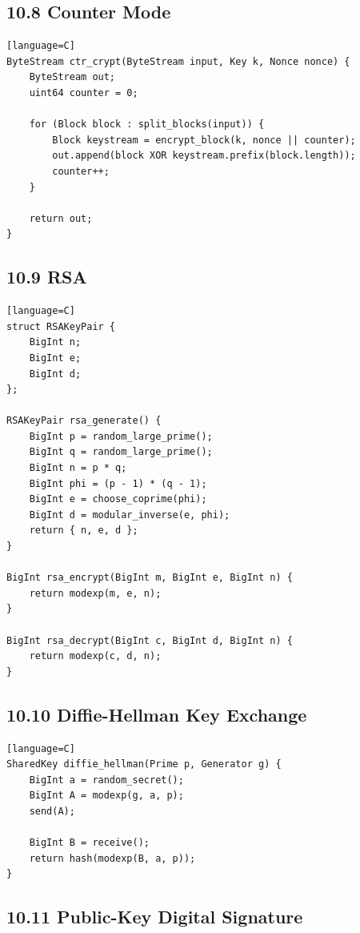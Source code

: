 \documentclass[11pt]{article}
\begin{document}
\subsection{10.8 Counter Mode}\label{counter-mode}

\begin{verbatim}[language=C]
ByteStream ctr_crypt(ByteStream input, Key k, Nonce nonce) {
    ByteStream out;
    uint64 counter = 0;

    for (Block block : split_blocks(input)) {
        Block keystream = encrypt_block(k, nonce || counter);
        out.append(block XOR keystream.prefix(block.length));
        counter++;
    }

    return out;
}
\end{verbatim}

\subsection{10.9 RSA}\label{rsa}

\begin{verbatim}[language=C]
struct RSAKeyPair {
    BigInt n;
    BigInt e;
    BigInt d;
};

RSAKeyPair rsa_generate() {
    BigInt p = random_large_prime();
    BigInt q = random_large_prime();
    BigInt n = p * q;
    BigInt phi = (p - 1) * (q - 1);
    BigInt e = choose_coprime(phi);
    BigInt d = modular_inverse(e, phi);
    return { n, e, d };
}

BigInt rsa_encrypt(BigInt m, BigInt e, BigInt n) {
    return modexp(m, e, n);
}

BigInt rsa_decrypt(BigInt c, BigInt d, BigInt n) {
    return modexp(c, d, n);
}
\end{verbatim}

\subsection{10.10 Diffie-Hellman Key
Exchange}\label{diffie-hellman-key-exchange}

\begin{verbatim}[language=C]
SharedKey diffie_hellman(Prime p, Generator g) {
    BigInt a = random_secret();
    BigInt A = modexp(g, a, p);
    send(A);

    BigInt B = receive();
    return hash(modexp(B, a, p));
}
\end{verbatim}

\subsection{10.11 Public-Key Digital
Signature}\label{public-key-digital-signature}
\end{document}
